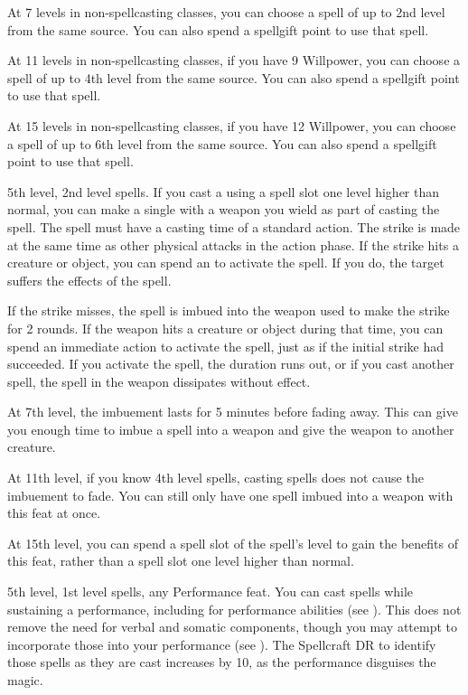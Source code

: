     At 7 levels in non-spellcasting classes, you can choose a spell of up to 2nd level from the same source. You can also spend a spellgift point to use that spell.

    At 11 levels in non-spellcasting classes, if you have 9 Willpower, you can choose a spell of up to 4th level from the same source. You can also spend a spellgift point to use that spell.

    At 15 levels in non-spellcasting classes, if you have 12 Willpower, you can choose a spell of up to 6th level from the same source. You can also spend a spellgift point to use that spell.

    \featpre 5th level, 2nd level spells.
    \featben If you cast a  using a spell slot one level higher than normal, you can make a single  with a weapon you wield as part of casting the spell.
    The spell must have a casting time of a standard action.
    The strike is made at the same time as other physical attacks in the action phase.
    If the strike hits a creature or object, you can spend an  to activate the spell.
    If you do, the target suffers the effects of the spell.

    If the strike misses, the spell is imbued into the weapon used to make the strike for 2 rounds.
    If the weapon hits a creature or object during that time, you can spend an immediate action to activate the spell, just as if the initial strike had succeeded.
    If you activate the spell, the duration runs out, or if you cast another spell, the spell in the weapon dissipates without effect.

    At 7th level, the imbuement lasts for 5 minutes before fading away.
    This can give you enough time to imbue a spell into a weapon and give the weapon to another creature.

    At 11th level, if you know 4th level spells, casting spells does not cause the imbuement to fade.
    You can still only have one spell imbued into a weapon with this feat at once.

    At 15th level, you can spend a spell slot of the spell's level to gain the benefits of this feat, rather than a spell slot one level higher than normal.

    \featpres 5th level, 1st level spells, any Performance feat.
    \featben You can cast spells while sustaining a performance, including for performance abilities (see ).
    This does not remove the need for verbal and somatic components, though you may attempt to incorporate those into your performance (see ).
    The Spellcraft DR to identify those spells as they are cast increases by 10, as the performance disguises the magic.

